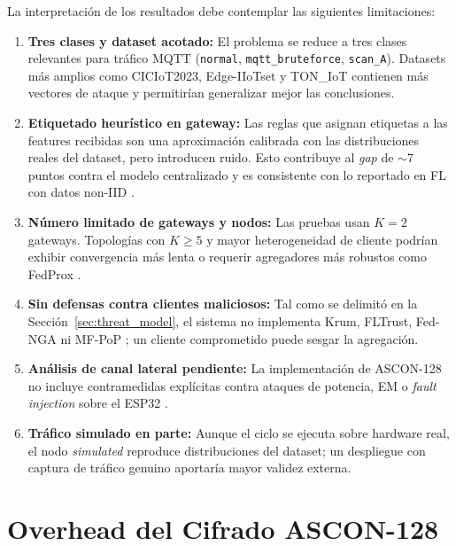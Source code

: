 La interpretación de los resultados debe contemplar las siguientes limitaciones:
\begin{enumerate}[noitemsep, topsep=0pt]
    \item \textbf{Tres clases y dataset acotado:} El problema se reduce a tres clases relevantes para tráfico MQTT (\texttt{normal}, \texttt{mqtt\_bruteforce}, \texttt{scan\_A}). Datasets más amplios como CICIoT2023, Edge-IIoTset y TON\_IoT \cite{Neto2023_CICIoT2023, Ferrag2022_EdgeIIoTset, Moustafa2020_TONIoT} contienen más vectores de ataque y permitirían generalizar mejor las conclusiones.
    \item \textbf{Etiquetado heurístico en gateway:} Las reglas que asignan etiquetas a las features recibidas son una aproximación calibrada con las distribuciones reales del dataset, pero introducen ruido. Esto contribuye al \emph{gap} de $\sim$7 puntos contra el modelo centralizado y es consistente con lo reportado en FL con datos non-IID \cite{Imteaj2022_FL_ResourceConstrainedSurvey, Albanbay2025}.
    \item \textbf{Número limitado de gateways y nodos:} Las pruebas usan $K=2$ gateways. Topologías con $K \geq 5$ y mayor heterogeneidad de cliente podrían exhibir convergencia más lenta o requerir agregadores más robustos como FedProx \cite{Li2020FedProx}.
    \item \textbf{Sin defensas contra clientes maliciosos:} Tal como se delimitó en la Sección~\ref{sec:threat_model}, el sistema no implementa Krum, FLTrust, Fed-NGA ni MF-PoP \cite{Tran2026_EdgeTrustShard}; un cliente comprometido puede sesgar la agregación.
    \item \textbf{Análisis de canal lateral pendiente:} La implementación de ASCON-128 no incluye contramedidas explícitas contra ataques de potencia, EM o \emph{fault injection} sobre el ESP32 \cite{Kaur2025_ASCON_Survey}.
    \item \textbf{Tráfico simulado en parte:} Aunque el ciclo se ejecuta sobre hardware real, el nodo \emph{simulated} reproduce distribuciones del dataset; un despliegue con captura de tráfico genuino aportaría mayor validez externa.
\end{enumerate}

\section{Overhead del Cifrado ASCON-128}
\label{sec:res_ascon}

